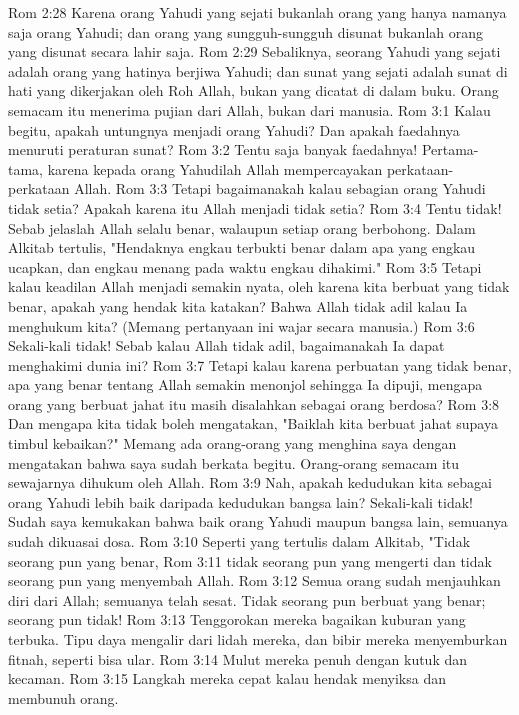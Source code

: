 Rom 2:28  Karena orang Yahudi yang sejati bukanlah orang yang hanya namanya saja orang Yahudi; dan orang yang sungguh-sungguh disunat bukanlah orang yang disunat secara lahir saja.
Rom 2:29  Sebaliknya, seorang Yahudi yang sejati adalah orang yang hatinya berjiwa Yahudi; dan sunat yang sejati adalah sunat di hati yang dikerjakan oleh Roh Allah, bukan yang dicatat di dalam buku. Orang semacam itu menerima pujian dari Allah, bukan dari manusia.
Rom 3:1  Kalau begitu, apakah untungnya menjadi orang Yahudi? Dan apakah faedahnya menuruti peraturan sunat?
Rom 3:2  Tentu saja banyak faedahnya! Pertama-tama, karena kepada orang Yahudilah Allah mempercayakan perkataan-perkataan Allah.
Rom 3:3  Tetapi bagaimanakah kalau sebagian orang Yahudi tidak setia? Apakah karena itu Allah menjadi tidak setia?
Rom 3:4  Tentu tidak! Sebab jelaslah Allah selalu benar, walaupun setiap orang berbohong. Dalam Alkitab tertulis, "Hendaknya engkau terbukti benar dalam apa yang engkau ucapkan, dan engkau menang pada waktu engkau dihakimi."
Rom 3:5  Tetapi kalau keadilan Allah menjadi semakin nyata, oleh karena kita berbuat yang tidak benar, apakah yang hendak kita katakan? Bahwa Allah tidak adil kalau Ia menghukum kita? (Memang pertanyaan ini wajar secara manusia.)
Rom 3:6  Sekali-kali tidak! Sebab kalau Allah tidak adil, bagaimanakah Ia dapat menghakimi dunia ini?
Rom 3:7  Tetapi kalau karena perbuatan yang tidak benar, apa yang benar tentang Allah semakin menonjol sehingga Ia dipuji, mengapa orang yang berbuat jahat itu masih disalahkan sebagai orang berdosa?
Rom 3:8  Dan mengapa kita tidak boleh mengatakan, "Baiklah kita berbuat jahat supaya timbul kebaikan?" Memang ada orang-orang yang menghina saya dengan mengatakan bahwa saya sudah berkata begitu. Orang-orang semacam itu sewajarnya dihukum oleh Allah.
Rom 3:9  Nah, apakah kedudukan kita sebagai orang Yahudi lebih baik daripada kedudukan bangsa lain? Sekali-kali tidak! Sudah saya kemukakan bahwa baik orang Yahudi maupun bangsa lain, semuanya sudah dikuasai dosa.
Rom 3:10  Seperti yang tertulis dalam Alkitab, "Tidak seorang pun yang benar,
Rom 3:11  tidak seorang pun yang mengerti dan tidak seorang pun yang menyembah Allah.
Rom 3:12  Semua orang sudah menjauhkan diri dari Allah; semuanya telah sesat. Tidak seorang pun berbuat yang benar; seorang pun tidak!
Rom 3:13  Tenggorokan mereka bagaikan kuburan yang terbuka. Tipu daya mengalir dari lidah mereka, dan bibir mereka menyemburkan fitnah, seperti bisa ular.
Rom 3:14  Mulut mereka penuh dengan kutuk dan kecaman.
Rom 3:15  Langkah mereka cepat kalau hendak menyiksa dan membunuh orang.
